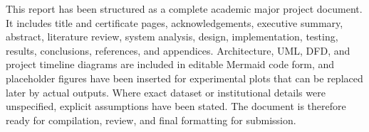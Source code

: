 This report has been structured as a complete academic major project document. It includes title and certificate pages, acknowledgements, executive summary, abstract, literature review, system analysis, design, implementation, testing, results, conclusions, references, and appendices. Architecture, UML, DFD, and project timeline diagrams are included in editable Mermaid code form, and placeholder figures have been inserted for experimental plots that can be replaced later by actual outputs. Where exact dataset or institutional details were unspecified, explicit assumptions have been stated. The document is therefore ready for compilation, review, and final formatting for submission.
